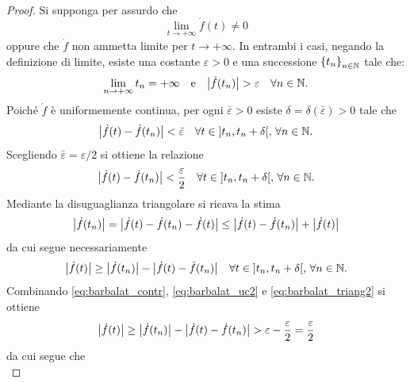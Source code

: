\documentclass[a4paper,12pt]{article}
\begin{document}
\begin{proof}
  Si supponga per assurdo che 
  \[
  \lim_{t \to +\infty} \dot{f}(t) \neq 0
  \]
  oppure che $\dot{f}$ non ammetta limite per $t \to +\infty$. In entrambi i casi, negando la definizione di limite, esiste una costante $\varepsilon > 0$ e una successione $\mleft\{ t_n \mright\}_{n \in \mathbb{N}}$ tale che:
  \begin{equation}\label{eq:barbalat_contr}
    \lim_{n \to +\infty}t_n = +\infty \quad \text{e} \quad \mleft|\dot{f}(t_n) \mright| > \varepsilon \quad \forall n \in \mathbb{N}.
  \end{equation}
  Poiché $\dot{f}$ è uniformemente continua, per ogni $\bar{\varepsilon} > 0$ esiste $\delta = \delta(\bar{\varepsilon}) > 0$ tale che
  \begin{equation*}
    \mleft| \dot{f}(t) - \dot{f}(t_n) \mright| < \bar{\varepsilon} \quad \forall t \in \interval[open]{t_n}{t_n + \delta}, \,\forall n \in \mathbb{N}.
  \end{equation*}
  Scegliendo $\bar{\varepsilon} = \varepsilon/2$ si ottiene la relazione
  \begin{equation}\label{eq:barbalat_uc2}
    \mleft| \dot{f}(t) - \dot{f}(t_n) \mright| < \frac{\varepsilon}{2} \quad \forall t \in \interval[open]{t_n}{t_n + \delta}, \,\forall n \in \mathbb{N}.
  \end{equation}
  Mediante la disuguaglianza triangolare si ricava la stima
  \begin{equation*}
    \mleft| \dot{f}(t_n) \mright| = \mleft|\dot{f}(t) - \dot{f}(t_n) - \dot{f}(t) \mright| \leq \mleft| \dot{f}(t) - \dot{f}(t_n) \mright| + \mleft| \dot{f}(t) \mright|
  \end{equation*}
  da cui segue necessariamente
  \begin{equation}\label{eq:barbalat_triang2}
    \mleft| \dot{f}(t) \mright| \geq \mleft| \dot{f}(t_n) \mright| - \mleft| \dot{f}(t) - \dot{f}(t_n) \mright| \quad \forall t \in \interval[open]{t_n}{t_n + \delta}, \,\forall n \in \mathbb{N}.
  \end{equation}
  Combinando \eqref{eq:barbalat_contr}, \eqref{eq:barbalat_uc2} e \eqref{eq:barbalat_triang2} si ottiene
  \begin{equation*}
    \mleft| \dot{f}(t) \mright| \geq \mleft| \dot{f}(t_n) \mright| - \mleft| \dot{f}(t) - \dot{f}(t_n) \mright| > \varepsilon - \frac{\varepsilon}{2} = \frac{\varepsilon}{2}
  \end{equation*}
  da cui segue che
  \begin{equation}\label{eq:barbalat_contr3}

\end{equation}
\end{proof}
\end{document}
